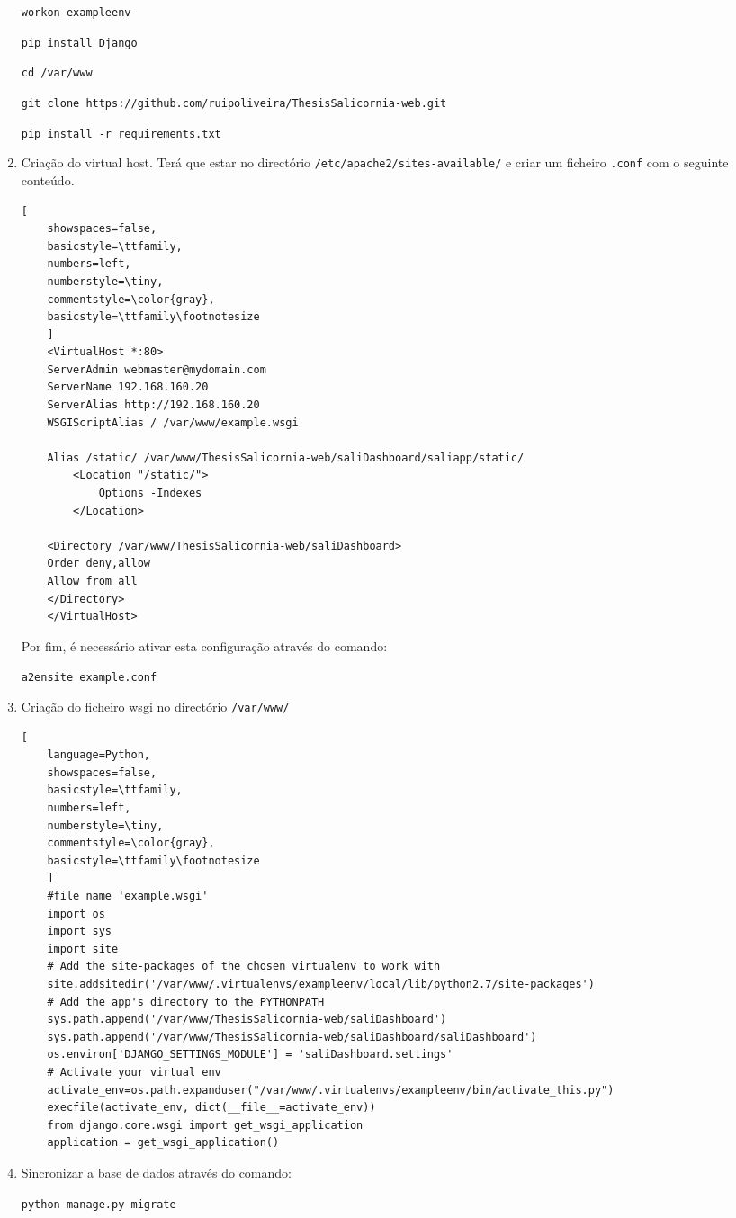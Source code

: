 \begin{enumerate}
	\texttt{workon exampleenv}
	
	\texttt{pip install Django}
	
	\texttt{cd /var/www}
	
	\texttt{git clone https://github.com/ruipoliveira/ThesisSalicornia-web.git}
	
	\texttt{pip install -r requirements.txt}
	
	

	

	\item Criação do virtual host. Terá que estar no directório \texttt{/etc/apache2/sites-available/} e criar um ficheiro \texttt{.conf} com o seguinte conteúdo. 
	
	\begin{lstlisting}[
	showspaces=false,
	basicstyle=\ttfamily,
	numbers=left,
	numberstyle=\tiny,
	commentstyle=\color{gray},
	basicstyle=\ttfamily\footnotesize
	]
	<VirtualHost *:80>
	ServerAdmin webmaster@mydomain.com
	ServerName 192.168.160.20
	ServerAlias http://192.168.160.20
	WSGIScriptAlias / /var/www/example.wsgi
	
	Alias /static/ /var/www/ThesisSalicornia-web/saliDashboard/saliapp/static/
		<Location "/static/">
			Options -Indexes
		</Location> 
	
	<Directory /var/www/ThesisSalicornia-web/saliDashboard>
	Order deny,allow    
	Allow from all
	</Directory>
	</VirtualHost>
	\end{lstlisting}
	
	Por fim, é necessário ativar esta configuração através do comando:
	
	\texttt{a2ensite example.conf}
	
	
	\item Criação do ficheiro wsgi no directório \texttt{/var/www/}
	
	\begin{lstlisting}[
	language=Python,
	showspaces=false,
	basicstyle=\ttfamily,
	numbers=left,
	numberstyle=\tiny,
	commentstyle=\color{gray},
	basicstyle=\ttfamily\footnotesize
	]
	#file name 'example.wsgi'
	import os
	import sys
	import site
	# Add the site-packages of the chosen virtualenv to work with
	site.addsitedir('/var/www/.virtualenvs/exampleenv/local/lib/python2.7/site-packages')
	# Add the app's directory to the PYTHONPATH
	sys.path.append('/var/www/ThesisSalicornia-web/saliDashboard')
	sys.path.append('/var/www/ThesisSalicornia-web/saliDashboard/saliDashboard')
	os.environ['DJANGO_SETTINGS_MODULE'] = 'saliDashboard.settings'
	# Activate your virtual env
	activate_env=os.path.expanduser("/var/www/.virtualenvs/exampleenv/bin/activate_this.py")
	execfile(activate_env, dict(__file__=activate_env))
	from django.core.wsgi import get_wsgi_application
	application = get_wsgi_application()\end{lstlisting}
	
	
	\item Sincronizar a base de dados através do comando: 
	
	\texttt{python manage.py migrate}
	
	 
	 
	 
\end{enumerate}




